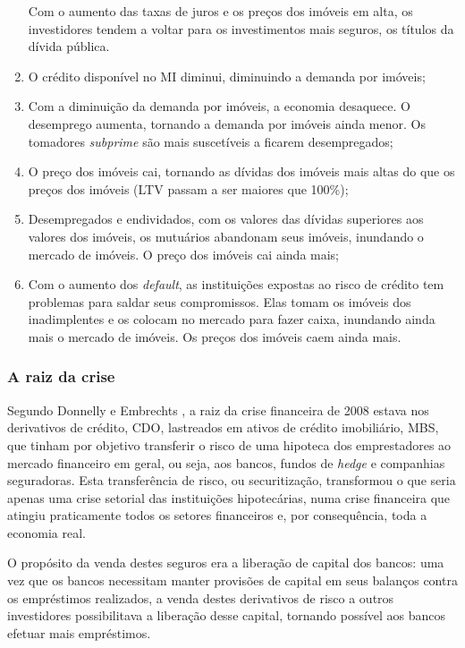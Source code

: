 \documentclass[
	12pt,				%
	oneside,			%
	a4paper,			%
	chapter=TITLE,		%
	section=TITLE,		%
	english,			%
	brazil				%
	]{abntex2}
\begin{document}
\begin{refsection}
\begin{enumerate}
  Com o aumento das taxas de juros e os preços dos imóveis em alta, os
  investidores tendem a voltar para os investimentos mais seguros, os títulos da
  dívida pública.
\item
  O crédito disponível no \gls{MI} diminui, diminuindo a demanda por imóveis;
\item
  Com a diminuição da demanda por imóveis, a economia desaquece. O desemprego
  aumenta, tornando a demanda por imóveis ainda menor. Os tomadores \emph{subprime}
  são mais suscetíveis a ficarem desempregados;
\item
  O preço dos imóveis cai, tornando as dívidas dos imóveis mais altas do que
  os preços dos imóveis (LTV passam a ser maiores que 100\%);
\item
  Desempregados e endividados, com os valores das dívidas superiores aos
  valores dos imóveis, os mutuários abandonam seus imóveis, inundando o mercado de
  imóveis. O preço dos imóveis cai ainda mais;
\item
  Com o aumento dos \emph{default}, as instituições expostas ao risco de crédito
  tem problemas para saldar seus compromissos. Elas tomam os imóveis dos
  inadimplentes e os colocam no mercado para fazer caixa, inundando ainda mais o
  mercado de imóveis. Os preços dos imóveis caem ainda mais.
\end{enumerate}
\hypertarget{a-raiz-da-crise}{%
\subsubsection{A raiz da crise}\label{a-raiz-da-crise}}

Segundo Donnelly e Embrechts \autocite*[3]{devil}, a raiz da crise financeira de 2008
estava nos derivativos de crédito, \gls{CDO}, lastreados em ativos de crédito
imobiliário, \gls{MBS}, que tinham por objetivo transferir o risco de uma
hipoteca dos emprestadores ao mercado financeiro em geral, ou seja, aos bancos,
fundos de \emph{hedge} e companhias seguradoras. Esta transferência de risco, ou
securitização, transformou o que seria apenas uma crise setorial das
instituições hipotecárias, numa crise financeira que atingiu praticamente todos
os setores financeiros e, por consequência, toda a economia real.

O propósito da venda destes seguros era a liberação de capital dos bancos: uma
vez que os bancos necessitam manter provisões de capital em seus balanços contra
os empréstimos realizados, a venda destes derivativos de risco a outros
investidores possibilitava a liberação desse capital, tornando possível aos
bancos efetuar mais empréstimos.


\end{refsection}
\end{document}
